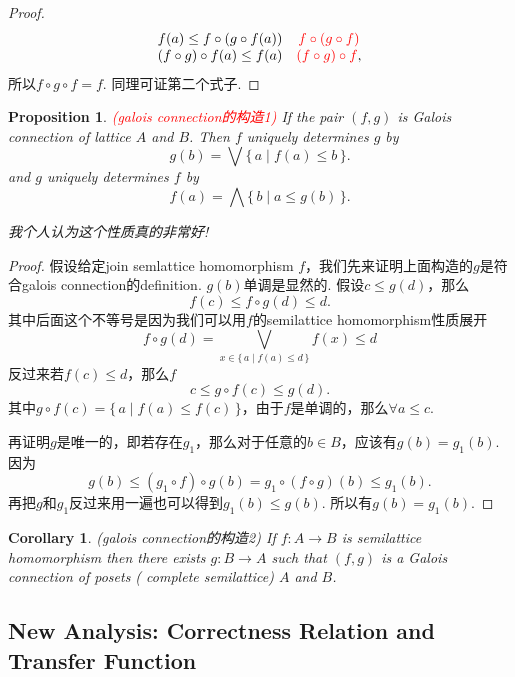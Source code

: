 \documentclass{article}
\newtheorem{corollary}[theorem]{Corollary}
\newtheorem{proposition}[theorem]{Proposition}
\newcommand*{\xfunc}[4]{{#2}\colon{#3}{#1}{#4}}
\newcommand*{\func}[3]{\xfunc{\to}{#1}{#2}{#3}}
\newcommand\Set[2]{\{\,#1\mid#2\,\}} %
\newcommand{\redt}[1]{\textcolor{red}{#1}}
\begin{document}
\begin{proof}
$$
\begin{array}{cc}
 f(a) \leq  f \circ (g \circ f(a)) & {\color{red} f \circ( g \circ f)} \\
 (f\circ g) \circ f(a) \leq f(a) & {\color{red}(f \circ g) \circ f}, \\
\end{array}
$$
所以$f \circ g \circ f  = f$. 同理可证第二个式子.
\end{proof}

\begin{proposition}
\rm \redt{(galois connection的构造1)} If the pair $(f,g)$ is Galois connection of lattice $A$ and $B$. Then $f$ uniquely determines $g$ by
$$
g(b) = \bigvee\Set{a}{f(a) \leq b}.
$$
and $g$ uniquely determines $f$ by
$$
f(a) = \bigwedge\Set{b}{a \leq g(b)}.
$$

{\color{blue} 我个人认为这个性质真的非常好}!
\end{proposition}


\begin{proof}
假设给定join semlattice homomorphism $f$，我们先来证明上面构造的$g$是符合galois connection的definition. $g(b)$单调是显然的. 假设$c \leq g(d)$，那么
$$
f(c) \leq f \circ g (d) \leq d.  
$$
其中后面这个不等号是因为我们可以用$f$的semilattice homomorphism性质展开
$$
f \circ g (d) = \bigvee_{x \in \Set{a}{f(a) \leq d}}f(x) \leq d  
$$
反过来若$f(c) \leq d$，那么$f$
$$
c \leq g \circ f(c) \leq g(d).
$$
其中$g \circ f(c) = \Set{a}{f(a) \leq f(c)}$，由于$f$是单调的，那么$\forall a \leq c$. 

再证明$g$是唯一的，即若存在$g_1$，那么对于任意的$b \in B$，应该有$g(b) = g_1(b)$. 因为
$$
g(b) \leq (g_1\circ f)\circ g(b) = g_1 \circ (f \circ g)(b) \leq g_1(b). 
$$
再把$g$和$g_1$反过来用一遍也可以得到$g_1(b) \leq g(b)$. 所以有$g(b) = g_1(b)$. 
\end{proof}

\begin{corollary}
\rm {\color{red} (galois connection的构造2)} If $\func{f}{A}{B}$ is semilattice homomorphism then there exists $\func{g}{B}{A}$ such that $(f,g)$ is a Galois connection of posets ({\color{red} complete semilattice}) $A$ and $B$.
\end{corollary}

\newpage
\subsection{New Analysis: Correctness Relation and Transfer Function}
\end{document}
